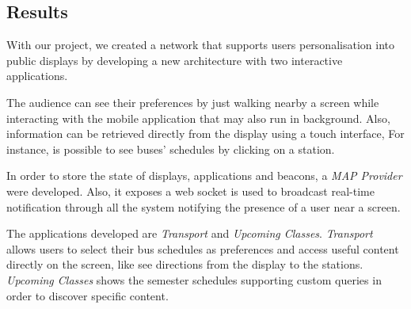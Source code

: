 \documentclass[]{usiinfbachelorproject}
\begin{document}
%
%
%
%
%
%
%

\subsection{Results}
With our project, we created a network that supports users personalisation into public displays by developing a new architecture with two interactive applications.

The audience can see their preferences by just walking nearby a screen while interacting with the mobile application that may also run in background. Also, information can be retrieved directly from the display using a touch interface, For instance, is possible to see buses' schedules by clicking on a station.

In order to store the state of displays, applications and beacons, a \emph{MAP Provider} were developed. Also, it exposes a web socket is used to broadcast real-time notification through all the system notifying the presence of a user near a screen.

The applications developed are \emph{Transport} and \emph{Upcoming Classes}. \emph{Transport} allows users to select their bus schedules as preferences and access useful content directly on the screen, like see directions from the display to the stations.
\emph{Upcoming Classes} shows the semester schedules supporting custom queries in order to discover specific content.
\end{document}
